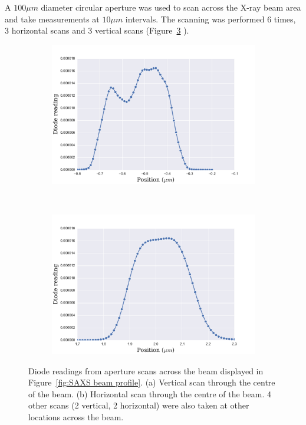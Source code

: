 A $100 \mu m$ diameter circular aperture was used to scan across the X-ray beam area and take measurements at $10 \mu m$ intervals.
The scanning was performed 6 times, 3 horizontal scans and 3 vertical scans (Figure~\ref{fig:Aperture scans - experimental methods SAXS chapter} ).
\begin{figure}
    \centering
    \begin{subfigure}[b]{0.7\textwidth}
            \centering
            \includegraphics[width=\textwidth]{figures/saxs/SAXS_vertical_aperture_scan.pdf}
            \caption{}
            \label{fig:Vertical aperture scans - experimental methods SAXS chapter}
    \end{subfigure}
    \\
    \begin{subfigure}[b]{0.7\textwidth}
            \centering
            \includegraphics[width=\textwidth]{figures/saxs/SAXS_horizontal_aperture_scan.pdf}
            \caption{}
            \label{fig:Horizontal aperture scans - experimental methods SAXS chapter}
    \end{subfigure}
    \caption{Diode readings from aperture scans across the beam displayed in Figure~\ref{fig:SAXS beam profile}. (a) Vertical scan through the centre of the beam. (b) Horizontal scan through the centre of the beam. 4 other scans (2 vertical, 2 horizontal) were also taken at other locations across the beam.}
    \label{fig:Aperture scans - experimental methods SAXS chapter}
\end{figure}
